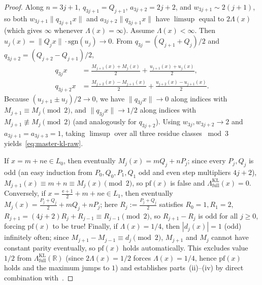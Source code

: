 \documentclass[11pt]{article}
\theoremstyle{definition}
\theoremstyle{remark}
\newcommand{\R}{\mathbb{R}}
\newcommand{\ee}{\mathrm{e}}
\newcommand{\Lam}{\Lambda}
\begin{document}
\begin{proof}
Along $n=3j+1$, $q_{3j+1}=Q_{j+1}$, $a_{3j+2}=2j+2$, and $w_{3j+1}\sim 2(j+1)$,
so both $w_{3j+1}\|q_{3j+1}x\|$ and $a_{3j+2}\|q_{3j+1}x\|$ have $\limsup$
equal to $2\Lam(x)$ (which gives $\infty$ whenever $\Lam(x)=\infty$).
Assume $\Lam(x)<\infty$. Then $u_j(x)=\|Q_j x\|\cdot\mathrm{sgn}(u_j)\to0$.
From $q_{3j}=(Q_{j+1}+Q_j)/2$ and $q_{3j+2}=(Q_{j+2}-Q_{j+1})/2$,
\begin{align*}
q_{3j}x&=\frac{M_{j+1}(x)+M_j(x)}{2}+\frac{u_{j+1}(x)+u_j(x)}{2},\\
q_{3j+2}x&=\frac{M_{j+2}(x)-M_{j+1}(x)}{2}+\frac{u_{j+2}(x)-u_{j+1}(x)}{2}.
\end{align*}
Because $(u_{j+1}\pm u_j)/2\to0$, we have $\|q_{3j}x\|\to0$ along indices with
$M_{j+1}\equiv M_j\pmod 2$, and $\|q_{3j}x\|\to1/2$ along indices with
$M_{j+1}\not\equiv M_j\pmod 2$ (and analogously for $q_{3j+2}$). Using
$w_{3j}, w_{3j+2}\to 2$ and $a_{3j+1}=a_{3j+3}=1$, taking $\limsup$ over all
three residue classes $\bmod 3$ yields~\eqref{eq:master-kl-raw}.

If $x=m+n\ee\in L_0$, then eventually $M_j(x)=m Q_j+n P_j$; since every $P_j,Q_j$
is odd (an easy induction from $P_0,Q_0,P_1,Q_1$ odd and even step multipliers $4j+2$),
$M_{j+1}(x)\equiv m+n\equiv M_j(x)\pmod 2$, so $\mathrm{pf}(x)$ is false and
$\Lam_{\mathrm{full}}^{\mathrm{KL}}(x)=0$. Conversely, if
$x=\frac{\ee+1}{2}+m+n\ee\in L_1$, then eventually
$M_j(x)=\frac{P_j+Q_j}{2}+m Q_j+n P_j$; here $R_j:=\frac{P_j+Q_j}{2}$ satisfies
$R_0=1, R_1=2$, $R_{j+1}=(4j+2)R_j+R_{j-1}\equiv R_{j-1}\pmod 2$, so
$R_{j+1}-R_j$ is odd for all $j\ge0$, forcing $\mathrm{pf}(x)$ to be true!
Finally, if $\Lam(x)=1/4$, then $|d_j(x)|=1$ (odd) infinitely often; since
$M_{j+1}-M_{j-1}\equiv d_j\pmod 2$, $M_{j+1}$ and $M_j$ cannot have constant
parity eventually, so $\mathrm{pf}(x)$ holds automatically. This excludes
value $1/2$ from $\Lam_{\mathrm{full}}^{\mathrm{KL}}(\R)$ (since $2\Lam(x)=1/2$
forces $\Lam(x)=1/4$, hence $\mathrm{pf}(x)$ holds and the maximum jumps to $1$)
and establishes parts~(ii)--(iv) by direct combination with~\cite{Paper2}.
\end{proof}
\end{document}
